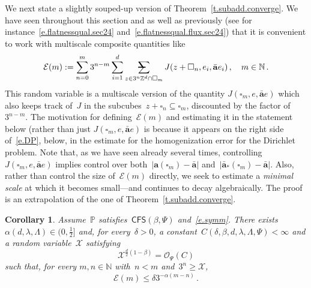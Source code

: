 \documentclass[11pt]{article} %
\makeatletter
\let\oldsquare\square %
\renewcommand{\square}{\oldsquare}
\numberwithin{equation}{section}
\newtheorem{corollary}[theorem]{Corollary}
\theoremstyle{definition}
\newcommand*{\N}{\ensuremath{\mathbb{N}}}
\newcommand*{\Zd}{\ensuremath{\mathbb{Z}^d}}
\renewcommand{\a}{\mathbf{a}}
\newcommand{\ahom}{\bar{\a}}
\newcommand{\cu}{\square}
\renewcommand{\P}{\mathbb{P}}
\newcommand{\X}{\mathcal{X}}
\renewcommand{\O}{\mathcal{O}}
\newcommand{\avsum}{\mathop{\mathpalette\avsuminner\relax}\displaylimits}
\newcommand\avsuminner[2]{%
  {\sbox0{$\m@th#1\sum$}%
   \vphantom{\usebox0}%
   \ooalign{%
     \hidewidth
     \smash{\,\rule[.23em]{8.8pt}{1.1pt} \relax}%
     \hidewidth\cr
     $\m@th#1\sum$\cr
   }%
  }%
}
\newcommand{\CFS}{\mathsf{CFS}}
\makeatother
\begin{document}
We next state a slightly souped-up version of Theorem~\ref{t.subadd.converge}. 
We have seen throughout this section and as well as previously (see for instance~\eqref{e.flatnessqual.sec24} and~\eqref{e.flatnessqual.flux.sec24})  that it is convenient to work with multiscale composite quantities like 
\begin{equation} 
\label{e.mcE.0}
\mathcal{E}(m) 
:=
\sum_{n=0}^{m}
3^{n-m} 
\sum_{i=1}^d
\avsum_{z\in 3^n\Zd\cap \cu_m}
J(z+\cu_n,e_i, \ahom e_i)
\,, \quad m\in\N\,.
\end{equation}
This random variable is a multiscale version of the quantity $J(\cu_m,e,\ahom e)$ which also keeps track of~$J$ in the subcubes~$z+\cu_n \subseteq \cu_m$, discounted by the factor of~$3^{n-m}$.
The motivation for defining~$\mathcal{E}(m)$ and estimating it in the statement below (rather than just $J(\cu_m,e,\ahom e)$ is because it appears on the right side of~\eqref{e.DP}, below, in the estimate for the homogenization error for the Dirichlet problem. Note that, as we have seen already several times, controlling~$J(\cu_m,e,\ahom e)$ implies control over both~$|\a(\cu_m) -\ahom|$ and~$| \ahom_*(\cu_m) -\ahom|$.  
Also, rather than control the size of~$\mathcal{E}(m)$ directly, we seek to estimate a \emph{minimal scale} at which it becomes small---and continues to decay algebraically.
The proof is an extrapolation of the one of Theorem~\ref{t.subadd.converge}. 












\begin{corollary}
\label{c.subadd.converge}
Assume~$\P$ satisfies~$\CFS(\beta,\Psi)$ and~\eqref{e.symm}. 
There exists~$\alpha(d,\lambda,\Lambda) \in (0,\tfrac12]$ and, for every~$\delta>0$, a constant~$C(\delta,\beta,d,\lambda,\Lambda,\Psi)<\infty$ and a random variable~$\X$ satisfying 
\begin{equation}
\label{e.mmmbound0}
\X^{\frac d2 (1-\beta)}
= \O_\Psi(C)
\end{equation}
such that, for every $m,n\in\N$ with~$n<m$ and~$3^n\geq \X$, 
\begin{equation} 
\label{e.aastar.concentrate.DD}
\mathcal{E}(m)
\leq \delta 3^{-\alpha(m-n)}
\,.
\end{equation}
\end{corollary}
\end{document}
